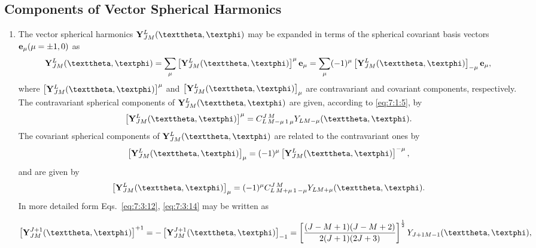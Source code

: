 \subsection{Components of Vector Spherical Harmonics}\label{sec:7.3.2}
\begin{enumerate}[label=(\alph*)]
\item The vector spherical harmonics $\vect{Y}_{J M}^{L}(\vartheta, \varphi)$ may be expanded in terms of the spherical covariant basis vectors $\mathbf{e}_{\mu}(\mu= \pm 1,0)$ as
\begin{equation}
\vect{Y}_{J M}^{L}(\vartheta, \varphi)=\sum_{\mu}\left[\vect{Y}_{J M}^{L}(\vartheta, \varphi)\right]^{\mu} \vect{e}_{\mu}=\sum_{\mu}(-1)^{\mu}\left[\vect{Y}_{J M}^{L}(\vartheta, \varphi)\right]_{-\mu} \vect{e}_{\mu}, \label{eq:7:3:11}
\end{equation}
where $\left[\vect{Y}_{J M}^{L}(\vartheta, \varphi)\right]^{\mu}$ and $\left[\vect{Y}_{J M}^{L}(\vartheta, \varphi)\right]_{\mu}$ are contravariant and covariant components, respectively.\\
The contravariant spherical components of $\vect{Y}_{J M}^{L}(\vartheta, \varphi)$ are given, according to \eqref{eq:7:1:5}, by
\begin{equation}
\left[\vect{Y}_{J M}^{L}(\vartheta, \varphi)\right]^{\mu}=\clebsch{L}{M-\mu}{1}{\mu}{J}{M} Y_{L M-\mu}(\vartheta, \varphi). \label{eq:7:3:12}
\end{equation}
The covariant spherical components of $\vect{Y}_{J M}^{L}(\vartheta, \varphi)$ are related to the contravariant ones by
\begin{equation}
\left[\vect{Y}_{J M}^{L}(\vartheta, \varphi)\right]_{\mu}=(-1)^{\mu}\left[\vect{Y}_{J M}^{L}(\vartheta, \varphi)\right]^{-\mu}, \label{eq:7:3:13}
\end{equation}
and are given by
\begin{equation}
\left[\vect{Y}_{J M}^{L}(\vartheta, \varphi)\right]_{\mu}=(-1)^{\mu} \clebsch{L}{M+\mu}{1}{-\mu}{J}{M} Y_{L M+\mu}(\vartheta, \varphi). \label{eq:7:3:14}
\end{equation}
In more detailed form Eqs.~\eqref{eq:7:3:12}, \eqref{eq:7:3:14} may be written as
\begin{fleqn}[1cm]
\begin{align}
\left[\vect{Y}_{J M}^{J+1}(\vartheta, \varphi)\right]^{+1}&=-\left[\vect{Y}_{J M}^{J+1}(\vartheta, \varphi)\right]_{-1}=\left[\frac{(J-M+1)(J-M+2)}{2(J+1)(2 J+3)}\right]^{\frac{1}{2}} Y_{J+1 M-1}(\vartheta, \varphi), \notag\\

\end{align}
\end{fleqn}
\end{enumerate}
